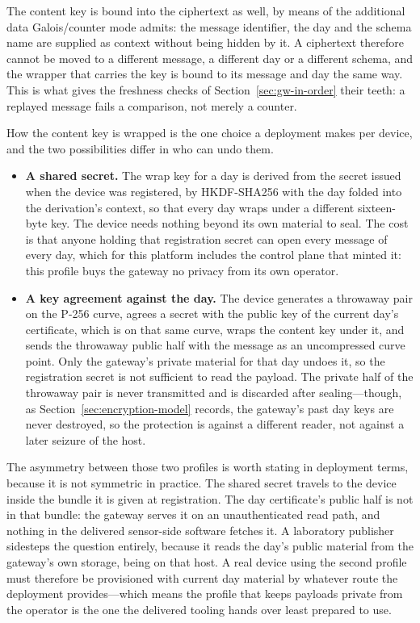 \documentclass[12pt,a4paper]{report}
\begin{document}
The content key is bound into the ciphertext as well, by means of the
additional data Galois/counter mode admits: the message identifier, the day
and the schema name are supplied as context without being hidden by it. A
ciphertext therefore cannot be moved to a different message, a different day
or a different schema, and the wrapper that carries the key is bound to its
message and day the same way.
This is what gives the freshness checks of Section~\ref{sec:gw-in-order}
their teeth: a replayed message fails a comparison, not merely a counter.

How the content key is wrapped is the one choice a deployment makes per
device, and the two possibilities differ in who can undo them.

\begin{itemize}
    \item \textbf{A shared secret.} The wrap key for a day is derived from
    the secret issued when the device was registered, by HKDF-SHA256 with
    the day folded into the derivation's context, so that every day wraps
    under a different sixteen-byte key. The device needs nothing beyond its
    own material to seal. The cost is that
    anyone holding that registration secret can open every message of every
    day, which for this platform includes the control plane that minted it:
    this profile buys the gateway no privacy from its own operator.
    \item \textbf{A key agreement against the day.} The device generates a
    throwaway pair on the P-256 curve, agrees a secret with the public key
    of the current day's certificate, which is on that same curve, wraps the
    content key under it, and sends the throwaway public half with the
    message as an uncompressed curve point. Only the gateway's private
    material for that day undoes it, so the registration secret is not
    sufficient to read the payload. The private half of the throwaway pair
    is never transmitted and is discarded after sealing---though, as
    Section~\ref{sec:encryption-model} records, the gateway's past day keys
    are never destroyed, so the protection is against a different reader,
    not against a later seizure of the host.
\end{itemize}

The asymmetry between those two profiles is worth stating in deployment
terms, because it is not symmetric in practice. The shared secret travels to
the device inside the bundle it is given at registration. The day
certificate's public half is not in that bundle: the gateway serves it on an
unauthenticated read path, and nothing in the delivered sensor-side software
fetches it. A laboratory publisher sidesteps the question entirely, because
it reads the day's public material from the gateway's own storage, being on
that host. A real device using the second profile must therefore be
provisioned with current day material by whatever route the deployment
provides---which means the profile that keeps payloads private from the
operator is the one the delivered tooling hands over least prepared to use.
\end{document}

